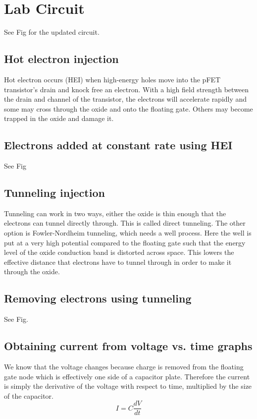 \section{Lab Circuit}
See Fig for the updated circuit.
\subsection{Hot electron injection}
Hot electron occurs (HEI) when high-energy holes move into the pFET transistor's drain and knock free an electron. With a high
field strength between the drain and channel of the transistor, the electrons will accelerate rapidly and some may cross through the
oxide and onto the floating gate. Others may become trapped in the oxide and damage it.

\subsection{Electrons added at constant rate using HEI}
See Fig

\subsection{Tunneling injection}
Tunneling can work in two ways, either the oxide is thin enough that the electrons can tunnel directly through. This is called direct tunneling.
The other option is Fowler-Nordheim tunneling, which needs a well process. Here the well is put at a very high potential compared to the floating
gate such that the energy level of the oxide conduction band is distorted across space. This lowers the effective distance that electrons have to
tunnel through in order to make it through the oxide.

\subsection{Removing electrons using tunneling}
See Fig.

\subsection{Obtaining current from voltage vs. time graphs}
We know that the voltage changes because charge is removed from the floating gate node which is effectively one side of a capacitor plate. 
Therefore the current is simply the derivative of the voltage with respect to time, multiplied by the size of the capacitor.
\begin{equation*}
    I = C\frac{dV}{dt}
\end{equation*}

